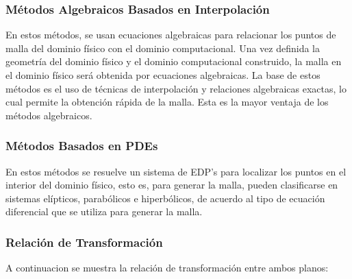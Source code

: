 \documentclass[11pt,letterpaper]{article}
\begin{document}
\subsubsection{Métodos Algebraicos Basados en Interpolación}
En estos m\'etodos, se usan ecuaciones algebraicas para relacionar los puntos de malla del dominio f\'isico con el dominio computacional. Una vez definida la geometr\'ia del dominio f\'isico y el dominio computacional construido, la malla en el dominio físico será obtenida por ecuaciones algebraicas. La base de estos m\'etodos es el uso de t\'ecnicas de interpolaci\'on y relaciones algebraicas exactas, lo cual permite la obtenci\'on r\'apida de la malla. Esta es la mayor ventaja de los m\'etodos algebraicos. 	
		\\

\subsubsection{Métodos Basados en PDEs}
En estos métodos se resuelve un sistema de EDP's para localizar los puntos en el interior del dominio físico, esto es, para generar la malla, pueden clasificarse en sistemas elípticos, parabólicos e hiperbólicos, de acuerdo al tipo de ecuación diferencial que se utiliza para generar la malla.\\

\subsubsection{Relación de Transformaci\'on}
A continuacion se muestra la relaci\'on de transformaci\'on entre ambos planos:
\end{document}
